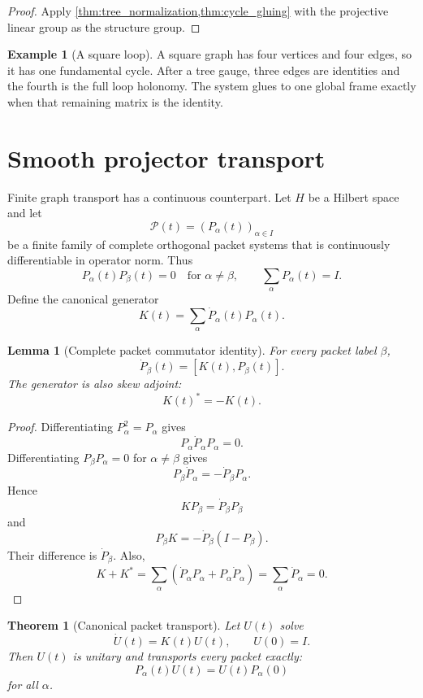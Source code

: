 \documentclass{aomart}
\newtheorem{theorem}{Theorem}[section]
\newtheorem{lemma}[lemma]{Lemma}
\theoremstyle{definition}
\newtheorem{example}[example]{Example}
\theoremstyle{remark}
\newcommand{\Pcal}{\mathcal P}
\begin{document}
\begin{proof}
Apply \cref{thm:tree_normalization,thm:cycle_gluing} with the projective linear group as the structure group.
\end{proof}

\begin{example}[A square loop]\label{ex:square_loop}
A square graph has four vertices and four edges, so it has one fundamental cycle.  After a tree gauge, three edges are identities and the fourth is the full loop holonomy.  The system glues to one global frame exactly when that remaining matrix is the identity.
\end{example}

\section{Smooth projector transport}\label{sec:kato_transport}

Finite graph transport has a continuous counterpart.  Let $H$ be a Hilbert space and let
\[
\Pcal(t)=(P_\alpha(t))_{\alpha\in I}
\]
be a finite family of complete orthogonal packet systems that is continuously differentiable in operator norm.  Thus
\[
P_\alpha(t)P_\beta(t)=0
\quad\text{for }\alpha\ne\beta,
\qquad
\sum_\alpha P_\alpha(t)=I.
\]
Define the canonical generator
\[
K(t)=\sum_\alpha \dot P_\alpha(t)P_\alpha(t).
\]

\begin{lemma}[Complete packet commutator identity]\label{lem:packet_commutator}
For every packet label $\beta$,
\[
\dot P_\beta(t)=[K(t),P_\beta(t)].
\]
The generator is also skew adjoint:
\[
K(t)^*=-K(t).
\]
\end{lemma}

\begin{proof}
Differentiating $P_\alpha^2=P_\alpha$ gives
\[
P_\alpha\dot P_\alpha P_\alpha=0.
\]
Differentiating $P_\beta P_\alpha=0$ for $\alpha\ne\beta$ gives
\[
P_\beta\dot P_\alpha=-\dot P_\beta P_\alpha.
\]
Hence
\[
K P_\beta=\dot P_\beta P_\beta
\]
and
\[
P_\beta K=-\dot P_\beta(I-P_\beta).
\]
Their difference is $\dot P_\beta$.  Also,
\[
K+K^*
=
\sum_\alpha(\dot P_\alpha P_\alpha+P_\alpha\dot P_\alpha)
=
\sum_\alpha\dot P_\alpha
=0.
\]
\end{proof}

\begin{theorem}[Canonical packet transport]\label{thm:kato_transport}
Let $U(t)$ solve
\[
\dot U(t)=K(t)U(t),
\qquad
U(0)=I.
\]
Then $U(t)$ is unitary and transports every packet exactly:
\[
P_\alpha(t)U(t)=U(t)P_\alpha(0)
\]
for all $\alpha$.
\end{theorem}
\end{document}
